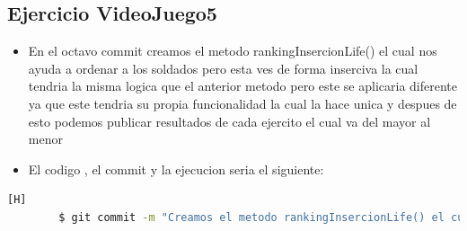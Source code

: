 \documentclass{article}
\begin{document}
	\subsection{Ejercicio VideoJuego5}
	\begin{itemize}	
		\item En el octavo commit creamos el metodo rankingInsercionLife() el cual nos ayuda a ordenar a los soldados pero esta ves de forma inserciva la cual tendria la misma logica que el anterior metodo pero este se aplicaria diferente ya que este tendria su propia funcionalidad la cual la hace unica y despues de esto podemos publicar resultados de cada ejercito el cual va del mayor al menor
		\item El codigo , el commit y la ejecucion seria el siguiente:
	\end{itemize}	
	\begin{lstlisting}[language=bash,caption={Commit}][H]
		$ git commit -m "Creamos el metodo rankingInsercionLife() el cual nos ayuda a ordenar a los soldados pero esta ves de forma inserciva la cual tendria la misma logica que el anterior metodo pero este se aplicaria diferente ya que este tendria su propia funcionalidad la cual la hace unica y despues de esto podemos publicar resultados de cada ejercito el cual va del mayor al menor"
	\end{lstlisting}	
\end{document}

